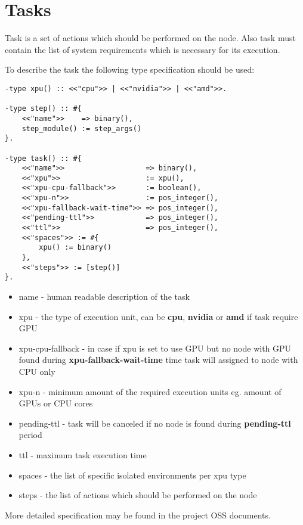 \section{Tasks}

Task is a set of actions which should be performed on the node.
Also task must contain the list of system requirements which is necessary for its execution.

To describe the task the following type specification should be used:

\begin{verbatim}
-type xpu() :: <<"cpu">> | <<"nvidia">> | <<"amd">>.

-type step() :: #{
    <<"name">>    => binary(),
    step_module() := step_args()
}.

-type task() :: #{
    <<"name">>                   => binary(),
    <<"xpu">>                    := xpu(),
    <<"xpu-cpu-fallback">>       := boolean(),
    <<"xpu-n">>                  := pos_integer(),
    <<"xpu-fallback-wait-time">> => pos_integer(),
    <<"pending-ttl">>            => pos_integer(),
    <<"ttl">>                    => pos_integer(),
    <<"spaces">> := #{
        xpu() := binary()
    },
    <<"steps">> := [step()]
}.
\end{verbatim}

\begin{itemize}
    \item name - human readable description of the task
    \item xpu - the type of execution unit, can be \textbf{cpu}, \textbf{nvidia} or \textbf{amd} if task require GPU
    \item xpu-cpu-fallback - in case if xpu is set to use GPU but no node with GPU found during \textbf{xpu-fallback-wait-time} time task will assigned to node with CPU only
    \item xpu-n - minimum amount of the required execution units eg. amount of GPUs or CPU cores
    \item pending-ttl - task will be canceled if no node is found during \textbf{pending-ttl} period
    \item ttl - maximum task execution time
    \item spaces - the list of specific isolated environments per xpu type
    \item steps - the list of actions which should be performed on the node
\end{itemize}

More detailed specification may be found in the project OSS\cite{oss} documents.


